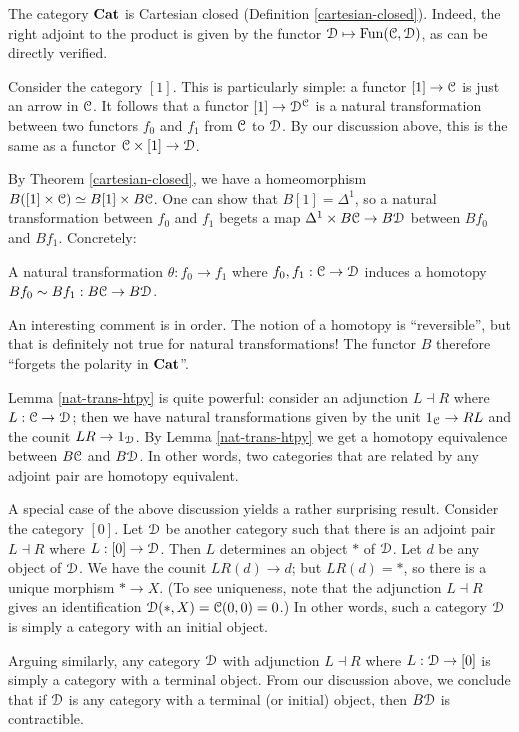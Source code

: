 The category $\mathbf{Cat}$ is Cartesian closed (Definition \ref{cartesian-closed}).
Indeed, the right adjoint to the product is given by the functor
$\mathcal D\mapsto\operatorname{Fun}(\mathcal C,\mathcal D)$, as can be directly verified.

Consider the category $[1]$. This is particularly simple: a functor $[1]\to\mathcal C$
is just an arrow in $\mathcal C$. It follows that a functor $[1]\to\mathcal D^\mathcal C$ is a
natural transformation between two functors $f_0$ and $f_1$ from $\mathcal C$ to
$\mathcal D$. By our discussion above, this is the same as a functor
$\mathcal C\times[1]\to\mathcal D$.

By Theorem \ref{cartesian-closed}, we have a homeomorphism $B([1]\times
\mathcal C)\simeq B[1]\times B\mathcal C$. One can show that $B[1] = \Delta^1$, so a natural
transformation between $f_0$ and $f_1$ begets a map $\Delta^1\times B\mathcal C\to
B\mathcal D$ between $Bf_0$ and $Bf_1$. Concretely:
\begin{lemma}\label{nat-trans-htpy}
    A natural transformation $\theta:f_0\to f_1$ where $f_0,f_1:\mathcal C\to\mathcal D$
    induces a homotopy $Bf_0\sim Bf_1:B\mathcal C\to B\mathcal D$.
\end{lemma}
An interesting comment is in order. The notion of a homotopy is ``reversible'',
but that is definitely not true for natural transformations! The functor $B$
therefore ``forgets the polarity in $\mathbf{Cat}$''.

Lemma \ref{nat-trans-htpy} is quite powerful: consider an adjunction $L\dashv
R$ where $L:\mathcal C\to \mathcal D$; then we have natural transformations given by the unit
$1_\mathcal C\to RL$ and the counit $LR\to 1_\mathcal D$. By Lemma \ref{nat-trans-htpy} we
get a homotopy equivalence between $B\mathcal C$ and $B\mathcal D$. In other words, two
categories that are related by any adjoint pair are homotopy equivalent.

A special case of the above discussion yields a rather surprising result.
Consider the category $[0]$. Let $\mathcal D$ be another category such that there is
an adjoint pair $L\dashv R$ where $L:[0]\to \mathcal D$. Then $L$ determines an object
$\ast$ of $\mathcal D$. Let $d$ be any object of $\mathcal D$. We have the counit $LR(d)\to
d$; but $LR(d) = \ast$, so there is a unique morphism $\ast\to X$. (To see
uniqueness, note that the adjunction $L\dashv R$ gives an identification
$\mathcal D(\ast,X) = \mathcal C(0,0) = 0$.) In other words, such a category $\mathcal D$ is simply
a category with an initial object.

Arguing similarly, any category $\mathcal D$ with adjunction $L\dashv R$ where
$L:\mathcal D\to [0]$ is simply a category with a terminal object. From our discussion
above, we conclude that if $\mathcal D$ is any category with a terminal (or initial)
object, then $B\mathcal D$ is contractible.
